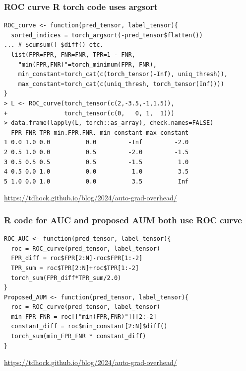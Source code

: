 \documentclass[t]{beamer}
\begin{document}
\begin{frame}[fragile]
  \frametitle{ROC curve R torch code uses argsort}
\small
  \begin{verbatim}
ROC_curve <- function(pred_tensor, label_tensor){
  sorted_indices = torch_argsort(-pred_tensor$flatten())
... # $cumsum() $diff() etc.
  list(FPR=FPR, FNR=FNR, TPR=1 - FNR, 
    "min(FPR,FNR)"=torch_minimum(FPR, FNR),
    min_constant=torch_cat(c(torch_tensor(-Inf), uniq_thresh)),
    max_constant=torch_cat(c(uniq_thresh, torch_tensor(Inf))))
}
> L <- ROC_curve(torch_tensor(c(2,-3.5,-1,1.5)),
+                torch_tensor(c(0,   0, 1,  1)))
> data.frame(lapply(L, torch::as_array), check.names=FALSE)
  FPR FNR TPR min.FPR.FNR. min_constant max_constant
1 0.0 1.0 0.0          0.0         -Inf         -2.0
2 0.5 1.0 0.0          0.5         -2.0         -1.5
3 0.5 0.5 0.5          0.5         -1.5          1.0
4 0.5 0.0 1.0          0.0          1.0          3.5
5 1.0 0.0 1.0          0.0          3.5          Inf
\end{verbatim}

    \url{https://tdhock.github.io/blog/2024/auto-grad-overhead/}

\end{frame}

\begin{frame}[fragile]
  \frametitle{R code for AUC and proposed AUM both use ROC curve}

  \begin{verbatim}
ROC_AUC <- function(pred_tensor, label_tensor){
  roc = ROC_curve(pred_tensor, label_tensor)
  FPR_diff = roc$FPR[2:N]-roc$FPR[1:-2]
  TPR_sum = roc$TPR[2:N]+roc$TPR[1:-2]
  torch_sum(FPR_diff*TPR_sum/2.0)
}
Proposed_AUM <- function(pred_tensor, label_tensor){
  roc = ROC_curve(pred_tensor, label_tensor)
  min_FPR_FNR = roc[["min(FPR,FNR)"]][2:-2]
  constant_diff = roc$min_constant[2:N]$diff()
  torch_sum(min_FPR_FNR * constant_diff)
}
\end{verbatim}

\small  \url{https://tdhock.github.io/blog/2024/auto-grad-overhead/}
\end{frame}
\end{document}
